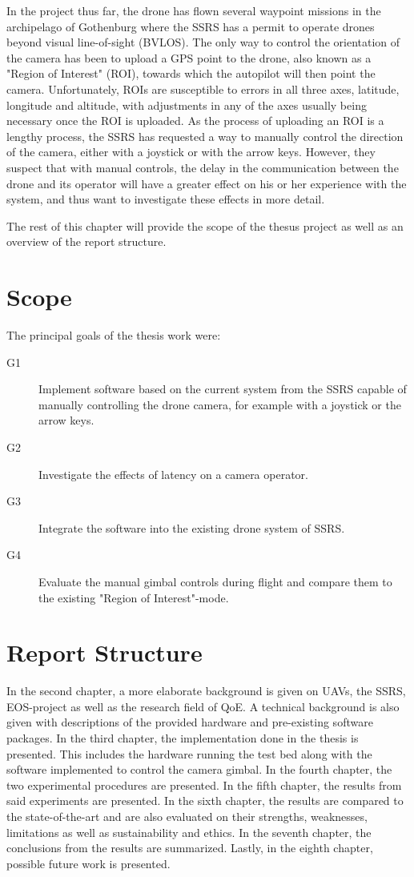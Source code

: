 \documentclass[nofilelist]{cslthse-msc}
\begin{document}
In the project thus far, the drone has flown several waypoint missions in the archipelago of Gothenburg where the SSRS has a permit to operate drones beyond visual line-of-sight (BVLOS). The only way to control the orientation of the camera has been to upload a GPS point to the drone, also known as a "Region of Interest" (ROI), towards which the autopilot will then point the camera. Unfortunately, ROIs are susceptible to errors in all three axes, latitude, longitude and altitude, with adjustments in any of the axes usually being necessary once the ROI is uploaded. As the process of uploading an ROI is a lengthy process, the SSRS has requested a way to manually control the direction of the camera, either with a joystick or with the arrow keys. However, they suspect that with manual controls, the delay in the communication between the drone and its operator will have a greater effect on his or her experience with the system, and thus want to investigate these effects in more detail.

The rest of this chapter will provide the scope of the thesus project as well as an overview of the report structure.

\section{Scope}
\label{sec:scope}
The principal goals of the thesis work were:
\begin{description}
   \item[G1] Implement software based on the current system from the SSRS capable of manually controlling the drone camera, for example with a joystick or the arrow keys. 
   \item[G2] Investigate the effects of latency on a camera operator. 
   \item[G3] Integrate the software into the existing drone system of SSRS.
   \item[G4] Evaluate the manual gimbal controls during flight and compare them to the existing "Region of Interest"-mode.
\end{description}

\section{Report Structure}
In the second chapter, a more elaborate background is given on UAVs, the SSRS, EOS-project as well as the research field of QoE. A technical background is also given with descriptions of the provided hardware and pre-existing software packages. In the third chapter, the implementation done in the thesis is presented. This includes the hardware running the test bed along with the software implemented to control the camera gimbal. In the fourth chapter, the two experimental procedures are presented. In the fifth chapter, the results from said experiments are presented. In the sixth chapter, the results are compared to the state-of-the-art and are also evaluated on their strengths, weaknesses, limitations as well as sustainability and ethics. In the seventh chapter, the conclusions from the results are summarized. Lastly, in the eighth chapter, possible future work is presented.
\end{document}
